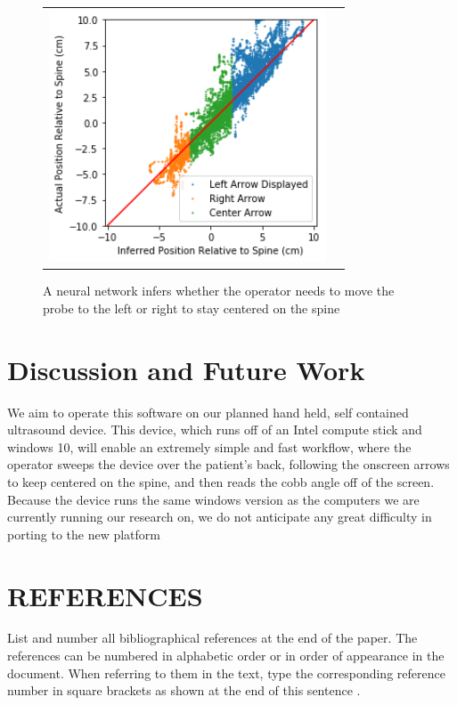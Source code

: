 \documentclass{article}
\begin{document}
\begin{figure}
\centering
\begin{tabular}{cc}
\centering
\includegraphics[height=7.5cm,keepaspectratio]{Guidance}
\end{tabular}
\caption{A neural network infers whether the operator needs to move the probe to the left or right to stay centered on the spine
}
\end{figure}

\section{Discussion and Future Work}
We aim to operate this software on our planned hand held, self contained ultrasound device. This device, which runs off of an Intel compute stick and windows 10, will enable an extremely simple and fast workflow, where the operator sweeps the device over the patient’s back, following the onscreen arrows to keep centered on the spine, and then reads the cobb angle off of the screen. Because the device runs the same windows version as the computers we are currently running our research on, we do not anticipate any great difficulty in porting to the new platform


\section{REFERENCES}
\label{sec:ref}

List and number all bibliographical references at the end of the paper.  The references can be numbered in alphabetic order or in order of appearance in the document.  When referring to them in the text, type the corresponding reference number in square brackets as shown at the end of this sentence \cite{C2}.



\end{document}
